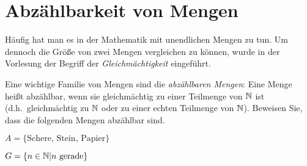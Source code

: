 \documentclass[11pt]{scrartcl}
\begin{document}
\section{Abzählbarkeit von Mengen}
Häufig hat man es in der Mathematik mit unendlichen Mengen zu tun.
Um dennoch die Größe von zwei Mengen vergleichen zu können, wurde in der Vorlesung der Begriff der \emph{Gleichmächtigkeit} eingeführt.

Eine wichtige Familie von Mengen sind die \emph{abzählbaren Mengen}:
Eine Menge heißt abzählbar, wenn sie gleichmächtig zu einer Teilmenge von $\mathbb{N}$ ist (d.h.\ gleichmächtig zu $\mathbb{N}$ oder zu einer echten Teilmenge von $\mathbb{N}$).
Beweisen Sie, dass die folgenden Mengen abzählbar sind.
  \begin{subex}
    \item $A = \{ \mathrm{Schere},\, \mathrm{Stein},\, \mathrm{Papier} \}$
    \item $G = \{ n \in \mathbb{N} \vert n \mbox{ gerade} \}$
  \end{subex}  
\end{document}
